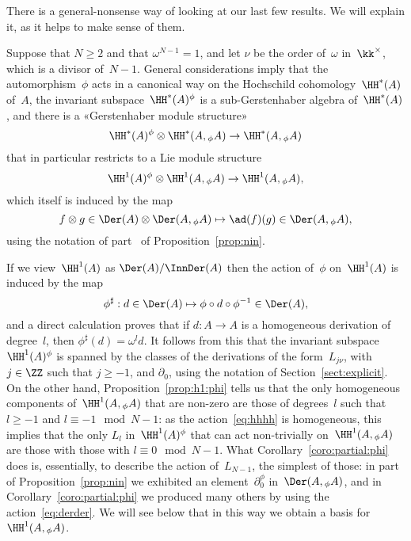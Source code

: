 \begin{Remark}\label{rem:general-nonsense}
There is a general-nonsense way of looking at our last few results. We will
explain it, as it helps to make sense of them.

Suppose that $N\geq2$ and that $\omega^{N-1}=1$, and let $\nu$ be the order
of~$\omega$ in~$\kk^\times$, which is a divisor of~$N-1$. General
considerations imply that the automorphism~$\phi$ acts in a canonical way
on the Hochschild cohomology~$\HH^*(A)$ of~$A$, the invariant
subspace~$\HH^*(A)^\phi$ is a sub-Gerstenhaber algebra of~$\HH^*(A)$, and
there is a «Gerstenhaber module structure»
  \[
  \HH^*(A)^\phi \otimes \HH^*(A,{}_\phi A)
  \to
  \HH^*(A,{}_\phi A)
  \]
that in particular restricts to a Lie module structure
  \[ \label{eq:hhhh}
  \HH^1(A)^\phi \otimes \HH^1(A,{}_\phi A)
  \to
  \HH^1(A,{}_\phi A),
  \]
which itself is induced by the map
  \[ \label{eq:derder}
  f\otimes g\in\Der(A)\otimes\Der(A,{}_\phi A)
  \mapsto
  \ad(f)(g) \in\Der(A,{}_\phi A),
  \]
using the notation of part~ of Proposition~\ref{prop:nin}. 

If we view~$\HH^1(A)$ as $\Der(A)/\InnDer(A)$ then the action of~$\phi$
on~$\HH^1(A)$ is induced by the map  
  \[
  \phi^\sharp:d\in\Der(A)\mapsto\phi\circ d\circ\phi^{-1}\in\Der(A),
  \]
and a direct calculation proves that if $d:A\to A$ is a homogeneous
derivation of degree~$l$, then $\phi^\sharp(d)=\omega^l d$. It follows from
this that the invariant subspace~$\HH^1(A)^\phi$ is spanned by the classes
of the derivations of the form~$L_{j\nu}$, with~$j\in\ZZ$ such that
$j\geq-1$, and $\partial_0$, using the notation of
Section~\ref{sect:explicit}. On the other hand,
Proposition~\ref{prop:h1:phi} tells us that the only homogeneous components
of~$\HH^1(A,{}_\phi A)$ that are non-zero are those of degrees~$l$ such
that $l\geq-1$ and $l\equiv-1\mod N-1$: as the action~\eqref{eq:hhhh} is
homogeneous, this implies that the only $L_l$ in~$\HH^1(A)^\phi$ that can
act non-trivially on~$\HH^1(A,{}_\phi A)$ are those with those with
$l\equiv0\mod N-1$. What Corollary~\ref{coro:partial:phi} does is,
essentially, to describe the action of~$L_{N-1}$, the simplest of those:
in part~ of Proposition~\ref{prop:nin} we exhibited an
element~$\partial_0^\phi$ in~$\Der(A,{}_\phi A)$, and in
Corollary~\ref{coro:partial:phi} we produced many others by using the
action~\eqref{eq:derder}. We will see below that in this way we 
obtain a basis for~$\HH^1(A,{}_\phi A)$.
\end{Remark}

